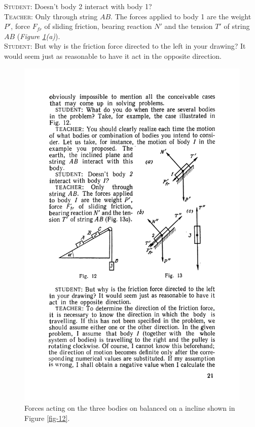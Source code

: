 \documentclass[a4paper,sfsidenotes]{tufte-book}
\begin{document}
\textsc{Student:} Doesn't body 2 interact with body 1? 
\\
\textsc{Teacher:} Only through string $AB$. The forces applied to body 1 are the weight $P'$,
force $F_{fr}$ of sliding friction, bearing reaction $N'$ and the tension $T'$ of string $AB$ (\emph{Figure \ref{fig-13}(a)}). 
\\
\textsc{Student:} But why is the friction force directed to the left in your drawing? It would seem just as reasonable to have it act in the opposite direction. \\

\begin{figure}
\centering
\includegraphics[width=0.5\linewidth]{fig-013a.pdf}
\caption{Forces acting on the three bodies on balanced on a incline shown in Figure \ref{fig-12}.}
\label{fig-13}
\end{figure}
\end{document}
